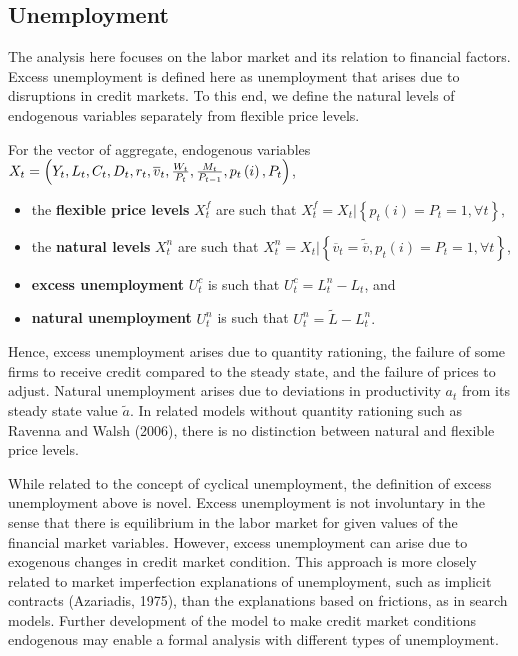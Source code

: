 \documentclass{article}
\begin{document}
\subsection{Unemployment}

The analysis here focuses on the labor market and its relation to financial
factors. Excess unemployment is defined here as unemployment that arises
due to disruptions in credit markets. To this end, we define the natural
levels of endogenous variables separately from flexible price levels.

\begin{definition}
For the vector of aggregate, endogenous variables $X_{t}=\left(
Y_{t},L_{t},C_{t},D_{t},r_{t},\overline{v}_{t},\frac{W_{t}}{P_{t}},\frac{%
M_{t}}{P_{t-1}},p_{t}\left( i\right) ,P_{t}\right)$,

\begin{itemize}
\item the \textbf{flexible price levels} $X_{t}^{f}$ are such that $%
X_{t}^{f}=X_{t}|\left\{ p_{t}\left( i\right) =P_{t}=1,\forall t\right\} ,$

\item the \textbf{natural levels} $X_{t}^{n}$ are such that $%
X_{t}^{n}=X_{t}|\left\{ \overline{v}_{t}=\widetilde{\overline{v}}%
,p_{t}\left( i\right) =P_{t}=1,\forall t\right\} $,

\item \textbf{excess unemployment }$U_{t}^{c}$ is such that $%
U_{t}^{c}=L_{t}^{n}-L_{t}$, and

\item \textbf{natural unemployment }$U_{t}^{n}$ is such that $U_{t}^{n}=%
\widetilde{L}-L_{t}^{n}.$
\end{itemize}
\end{definition}

Hence, excess unemployment arises due to quantity rationing, the failure of
some firms to receive credit compared to the steady state, and the failure
of prices to adjust. Natural unemployment arises due to deviations in
productivity $a_{t}$ from its steady state value $\widetilde{a}$. In
related models without quantity rationing such as Ravenna and Walsh (2006),
there is no distinction between natural and flexible price levels.

While related to the concept of cyclical unemployment, the definition of
excess unemployment above is novel. Excess unemployment is not involuntary
in the sense that there is equilibrium in the labor market for given values
of the financial market variables. However, excess unemployment can arise
due to exogenous changes in credit market condition. This approach is more
closely related to market imperfection explanations of unemployment, such as
implicit contracts (Azariadis, 1975), than the explanations based on
frictions, as in search models. Further development of the model to make
credit market conditions endogenous may enable a formal analysis with
different types of unemployment.
\end{document}
